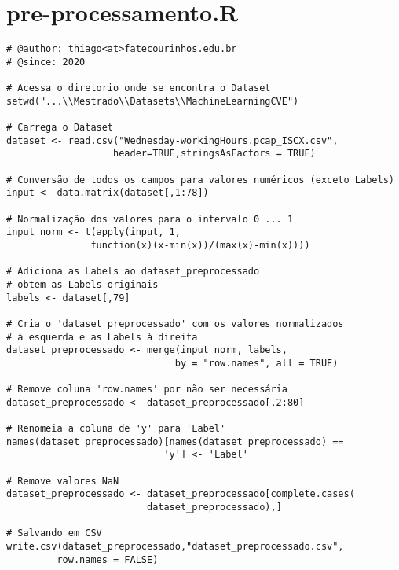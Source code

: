 \chapter{pre-processamento.R}

\begin{verbatim}
# @author: thiago<at>fatecourinhos.edu.br
# @since: 2020

# Acessa o diretorio onde se encontra o Dataset
setwd("...\\Mestrado\\Datasets\\MachineLearningCVE")

# Carrega o Dataset
dataset <- read.csv("Wednesday-workingHours.pcap_ISCX.csv", 
                   header=TRUE,stringsAsFactors = TRUE)

# Conversão de todos os campos para valores numéricos (exceto Labels)
input <- data.matrix(dataset[,1:78])

# Normalização dos valores para o intervalo 0 ... 1
input_norm <- t(apply(input, 1,
               function(x)(x-min(x))/(max(x)-min(x))))

# Adiciona as Labels ao dataset_preprocessado
# obtem as Labels originais
labels <- dataset[,79] 

# Cria o 'dataset_preprocessado' com os valores normalizados
# à esquerda e as Labels à direita
dataset_preprocessado <- merge(input_norm, labels,
                              by = "row.names", all = TRUE)

# Remove coluna 'row.names' por não ser necessária
dataset_preprocessado <- dataset_preprocessado[,2:80]

# Renomeia a coluna de 'y' para 'Label'
names(dataset_preprocessado)[names(dataset_preprocessado) ==
                            'y'] <- 'Label'

# Remove valores NaN
dataset_preprocessado <- dataset_preprocessado[complete.cases(
                         dataset_preprocessado),]

# Salvando em CSV
write.csv(dataset_preprocessado,"dataset_preprocessado.csv",
         row.names = FALSE)

\end{verbatim}

